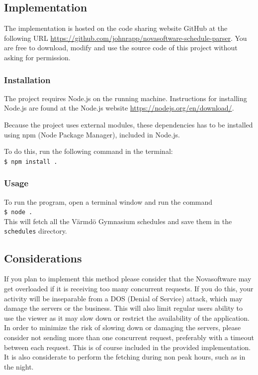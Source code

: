 \documentclass{article}
\begin{document}
	\subsection{Implementation}
	The implementation is hosted on the code sharing website GitHub at the following URL \url{https://github.com/johnrapp/novasoftware-schedule-parser}. You are free to download, modify and use the source code of this project without asking for permission. %
	
	\subsubsection{Installation}
	The project requires Node.js on the running machine. Instructions for installing Node.js are found at the Node.js website \url{https://nodejs.org/en/download/}. %
	
	Because the project uses external modules, these dependencies has to be installed using npm (Node Package Manager), included in Node.js.
	
	To do this, run the following command in the terminal:\\
	\texttt{\$ npm install .}
	
	\subsubsection{Usage}
	To run the program, open a terminal window and run the command\\
	\texttt{\$ node .}\\
	This will fetch all the Värmdö Gymnasium schedules and save them in the \texttt{schedules} directory.
	
	\subsection{Considerations}
	If you plan to implement this method please consider that the Novasoftware may get overloaded if it is receiving too many concurrent requests. If you do this, your activity will be inseparable from a DOS (Denial of Service) attack, which may damage the servers or the business. This will also limit regular users ability to use the viewer as it may slow down or restrict the availability of the application. In order to minimize the risk of slowing down or damaging the servers, please consider not sending more than one concurrent request, preferably with a timeout between each request. This is of course included in the provided implementation. It is also considerate to perform the fetching during non peak hours, such as in the night.
	
\end{document}
